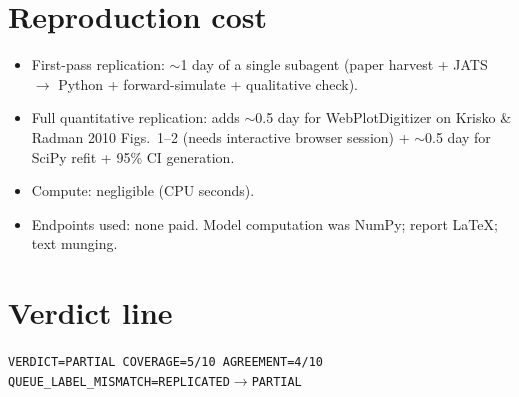 \documentclass[11pt]{article}
\begin{document}
\section{Reproduction cost}
\begin{itemize}
  \item First-pass replication: $\sim$1 day of a single subagent (paper harvest + JATS $\to$
        Python + forward-simulate + qualitative check).
  \item Full quantitative replication: adds $\sim$0.5 day for WebPlotDigitizer on Krisko \&
        Radman 2010 Figs.~1--2 (needs interactive browser session) + $\sim$0.5 day for SciPy
        refit + 95\% CI generation.
  \item Compute: negligible (CPU seconds).
  \item Endpoints used: none paid. Model computation was NumPy; report LaTeX; text munging.
\end{itemize}



\section*{Verdict line}
\texttt{VERDICT=PARTIAL COVERAGE=5/10 AGREEMENT=4/10 QUEUE\_LABEL\_MISMATCH=REPLICATED$\to$PARTIAL}
\end{document}
